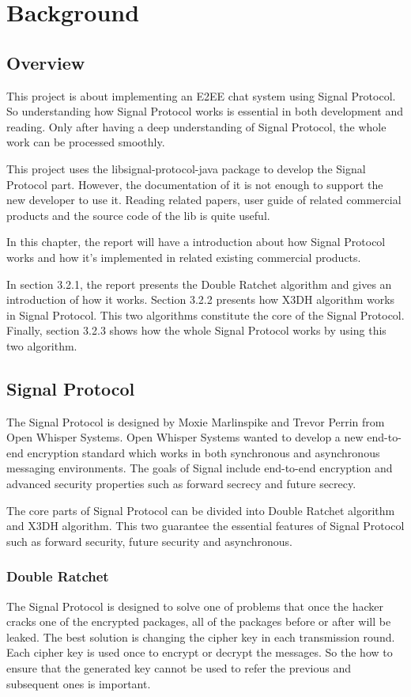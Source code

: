 \section{Background}

\subsection{Overview}
This project is about implementing an E2EE chat system using Signal Protocol. So understanding how Signal Protocol works is essential in both development and reading. Only after having a deep understanding of Signal Protocol, the whole work can be processed smoothly.

This project uses the libsignal-protocol-java package to develop the Signal Protocol part. However, the documentation of it is not enough to support the new developer to use it. Reading related papers, user guide of related commercial products and the source code of the lib is quite useful.

In this chapter, the report will have a introduction about how Signal Protocol works and how it's implemented in related existing commercial products.

In section 3.2.1, the report presents the Double Ratchet algorithm and gives an introduction of how it works. Section 3.2.2 presents how X3DH algorithm works in Signal Protocol. This two algorithms constitute the core of the Signal Protocol. Finally, section 3.2.3 shows how the whole Signal Protocol works by using this two algorithm.

\subsection{Signal Protocol}
The Signal Protocol is designed by Moxie Marlinspike and Trevor Perrin from Open Whisper Systems. Open Whisper Systems wanted to develop
a new end-to-end encryption standard which works in both synchronous and asynchronous messaging environments. The goals of Signal include end-to-end encryption and advanced security properties such as forward secrecy and future secrecy.

The core parts of Signal Protocol can be divided into Double Ratchet algorithm and X3DH algorithm. This two guarantee the essential features of Signal Protocol such as forward security, future security and asynchronous.

\subsubsection{Double Ratchet}
The Signal Protocol is designed to solve one of problems that once the hacker cracks one of the encrypted packages, all of the packages before or after will be leaked. The best solution is changing the cipher key in each transmission round. Each cipher key is used once to encrypt or decrypt the messages. So the how to ensure that the generated key cannot be used to refer the previous and subsequent ones is important.

